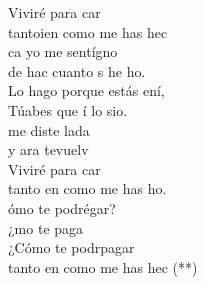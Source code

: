 \documentclass[12pt]{article}
\begin{document}
\begin{multicols*}{2}
\begin{cancion}
\begin{chorus}
	Viviré para car \\
	tantoien como me has hec \\
	ca yo me sentígno \\
	de hac cuanto s he ho.\\
	Lo hago porque estás ení, \\
	Túabes que í lo sio.\\
	 me diste lada \\
	y ara tevuelv\\
	Viviré para car\\
	tanto en como me has ho.\\
\jump
	ómo te podrégar?\\
	¿mo te paga  \\
	¿Cómo te podrpagar \\
	tanto en como me has hec (**)\\
	\end{chorus}%
	\jump\\
\end{cancion}%


\end{multicols*}
\end{document}
